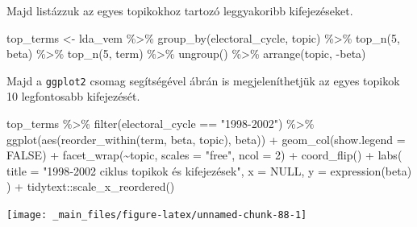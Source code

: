 \documentclass[
]{book}
\newenvironment{Shaded}{\begin{snugshade}}{\end{snugshade}}
\newcommand{\AttributeTok}[1]{\textcolor[rgb]{0.77,0.63,0.00}{#1}}
\newcommand{\ConstantTok}[1]{\textcolor[rgb]{0.00,0.00,0.00}{#1}}
\newcommand{\DecValTok}[1]{\textcolor[rgb]{0.00,0.00,0.81}{#1}}
\newcommand{\FunctionTok}[1]{\textcolor[rgb]{0.00,0.00,0.00}{#1}}
\newcommand{\NormalTok}[1]{#1}
\newcommand{\OtherTok}[1]{\textcolor[rgb]{0.56,0.35,0.01}{#1}}
\newcommand{\SpecialCharTok}[1]{\textcolor[rgb]{0.00,0.00,0.00}{#1}}
\newcommand{\StringTok}[1]{\textcolor[rgb]{0.31,0.60,0.02}{#1}}
\begin{document}
Majd listázzuk az egyes topikokhoz tartozó leggyakoribb kifejezéseket.

\begin{Shaded}
\begin{Highlighting}[]

\NormalTok{top\_terms }\OtherTok{\textless{}{-}}\NormalTok{ lda\_vem }\SpecialCharTok{\%\textgreater{}\%}
  \FunctionTok{group\_by}\NormalTok{(electoral\_cycle, topic) }\SpecialCharTok{\%\textgreater{}\%}
  \FunctionTok{top\_n}\NormalTok{(}\DecValTok{5}\NormalTok{, beta) }\SpecialCharTok{\%\textgreater{}\%}
  \FunctionTok{top\_n}\NormalTok{(}\DecValTok{5}\NormalTok{, term) }\SpecialCharTok{\%\textgreater{}\%}
  \FunctionTok{ungroup}\NormalTok{() }\SpecialCharTok{\%\textgreater{}\%}
  \FunctionTok{arrange}\NormalTok{(topic, }\SpecialCharTok{{-}}\NormalTok{beta)}
\end{Highlighting}
\end{Shaded}

Majd a \texttt{ggplot2} csomag segítségével ábrán is megjeleníthetjük az
egyes topikok 10 legfontosabb kifejezését.

\begin{Shaded}
\begin{Highlighting}[]
\NormalTok{top\_terms }\SpecialCharTok{\%\textgreater{}\%}
  \FunctionTok{filter}\NormalTok{(electoral\_cycle }\SpecialCharTok{==} \StringTok{"1998{-}2002"}\NormalTok{) }\SpecialCharTok{\%\textgreater{}\%}
  \FunctionTok{ggplot}\NormalTok{(}\FunctionTok{aes}\NormalTok{(}\FunctionTok{reorder\_within}\NormalTok{(term, beta, topic), beta)) }\SpecialCharTok{+}
  \FunctionTok{geom\_col}\NormalTok{(}\AttributeTok{show.legend =} \ConstantTok{FALSE}\NormalTok{) }\SpecialCharTok{+}
  \FunctionTok{facet\_wrap}\NormalTok{(}\SpecialCharTok{\textasciitilde{}}\NormalTok{topic, }\AttributeTok{scales =} \StringTok{"free"}\NormalTok{, }\AttributeTok{ncol =} \DecValTok{2}\NormalTok{) }\SpecialCharTok{+}
  \FunctionTok{coord\_flip}\NormalTok{() }\SpecialCharTok{+}
  \FunctionTok{labs}\NormalTok{(}
    \AttributeTok{title =} \StringTok{"1998{-}2002 ciklus topikok és kifejezések"}\NormalTok{,}
    \AttributeTok{x =} \ConstantTok{NULL}\NormalTok{,}
    \AttributeTok{y =} \FunctionTok{expression}\NormalTok{(beta)}
\NormalTok{  ) }\SpecialCharTok{+}
\NormalTok{  tidytext}\SpecialCharTok{::}\FunctionTok{scale\_x\_reordered}\NormalTok{()}
\end{Highlighting}
\end{Shaded}

\begin{center}\texttt{[image: \_main\_files/figure-latex/unnamed-chunk-88-1]} \end{center}
\end{document}
